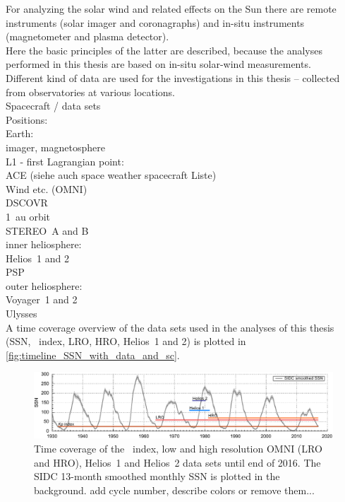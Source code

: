 
For analyzing the solar wind and related effects on the Sun there are remote instruments (solar imager and coronagraphs) and in-situ instruments (magnetometer and plasma detector).\\
Here the basic principles of the latter are described, because the analyses performed in this thesis are based on in-situ solar-wind measurements.\\



Different kind of data are used for the investigations in this thesis -- collected from observatories at various locations.\\

Spacecraft / data sets\\

Positions:\\
Earth:\\
	imager, magnetosphere\\
L1 - first Lagrangian point:\\
	ACE (siehe auch space weather spacecraft Liste)\\
	Wind etc. (OMNI)\\
	DSCOVR\\
1~au orbit\\
	STEREO~A and B\\
inner heliosphere:\\
	Helios~1 and 2\\
	PSP\\
outer heliosphere:\\
	Voyager~1 and 2\\
	Ulysses\\

A time coverage overview of the data sets used in the analyses of this thesis (SSN, \Kp~index, LRO, HRO, Helios~1 and 2) is plotted in \autoref{fig:timeline_SSN_with_data_and_sc}.\\
\begin{figure}[htb]
	\centering
	\includegraphics[width=\textwidth]{images/gnuplots/timeline_SSN_with_data_and_sc.pdf}
	\caption{Time coverage of the \Kp~index, low and high resolution OMNI (LRO and HRO), Helios~1 and Helios~2 data sets until end of 2016. The SIDC 13-month smoothed monthly SSN is plotted in the background. add cycle number, describe colors or remove them...}
	\label{fig:timeline_SSN_with_data_and_sc}
\end{figure}


